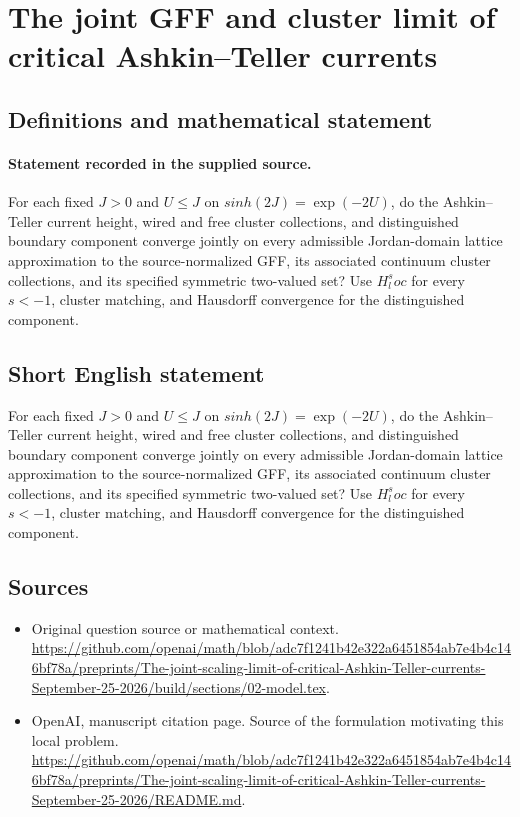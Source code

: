 \documentclass[11pt]{article}
\begin{document}
\section*{The joint GFF and cluster limit of critical Ashkin–Teller currents}\label{statement}
\subsection{Definitions and mathematical statement}
\paragraph{Statement recorded in the supplied source.}
For each fixed $J>0$ and $U\leq J$ on $sinh(2J)=\exp (-2U)$, do the Ashkin–Teller current height, wired and free cluster collections, and distinguished boundary component converge jointly on every admissible Jordan-domain lattice approximation to the source-normalized GFF, its associated continuum cluster collections, and its specified symmetric two-valued set? Use $H^s_loc$ for every $s<-1$, cluster matching, and Hausdorff convergence for the distinguished component.
\subsection{Short English statement}
For each fixed $J>0$ and $U\leq J$ on $sinh(2J)=\exp (-2U)$, do the Ashkin–Teller current height, wired and free cluster collections, and distinguished boundary component converge jointly on every admissible Jordan-domain lattice approximation to the source-normalized GFF, its associated continuum cluster collections, and its specified symmetric two-valued set? Use $H^s_loc$ for every $s<-1$, cluster matching, and Hausdorff convergence for the distinguished component.
\subsection{Sources}
\begin{itemize}
\item[S1] Original question source or mathematical context.
\url{https://github.com/openai/math/blob/adc7f1241b42e322a6451854ab7e4b4c146bf78a/preprints/The-joint-scaling-limit-of-critical-Ashkin-Teller-currents-September-25-2026/build/sections/02-model.tex}.
\item[S2] OpenAI, manuscript citation page. Source of the formulation motivating this local problem.
\url{https://github.com/openai/math/blob/adc7f1241b42e322a6451854ab7e4b4c146bf78a/preprints/The-joint-scaling-limit-of-critical-Ashkin-Teller-currents-September-25-2026/README.md}.
\end{itemize}
\end{document}
